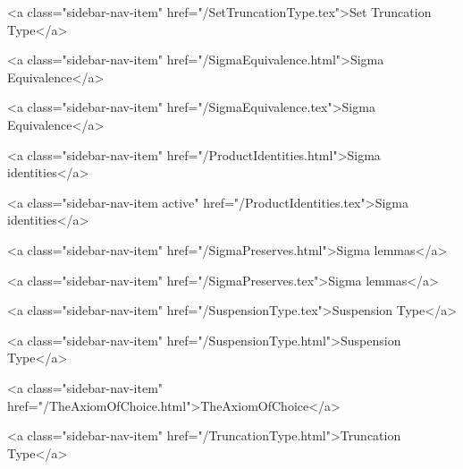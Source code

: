       
    
      
        
          <a class="sidebar-nav-item" href="/SetTruncationType.tex">Set Truncation Type</a>
        
      
    
      
        
          <a class="sidebar-nav-item" href="/SigmaEquivalence.html">Sigma Equivalence</a>
        
      
    
      
        
          <a class="sidebar-nav-item" href="/SigmaEquivalence.tex">Sigma Equivalence</a>
        
      
    
      
        
          <a class="sidebar-nav-item" href="/ProductIdentities.html">Sigma identities</a>
        
      
    
      
        
          <a class="sidebar-nav-item active" href="/ProductIdentities.tex">Sigma identities</a>
        
      
    
      
        
          <a class="sidebar-nav-item" href="/SigmaPreserves.html">Sigma lemmas</a>
        
      
    
      
        
          <a class="sidebar-nav-item" href="/SigmaPreserves.tex">Sigma lemmas</a>
        
      
    
      
        
          <a class="sidebar-nav-item" href="/SuspensionType.tex">Suspension Type</a>
        
      
    
      
        
          <a class="sidebar-nav-item" href="/SuspensionType.html">Suspension Type</a>
        
      
    
      
        
          <a class="sidebar-nav-item" href="/TheAxiomOfChoice.html">TheAxiomOfChoice</a>
        
      
    
      
        
          <a class="sidebar-nav-item" href="/TruncationType.html">Truncation Type</a>
        
